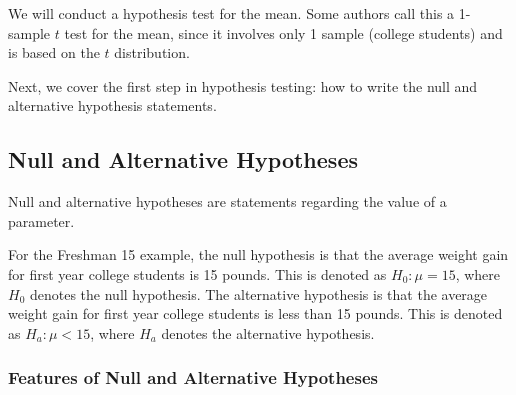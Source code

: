 \documentclass[
]{book}
\theoremstyle{definition}
\theoremstyle{definition}
\theoremstyle{definition}
\theoremstyle{definition}
\theoremstyle{remark}
\begin{document}
We will conduct a hypothesis test for the mean. Some authors call this a 1-sample \(t\) test for the mean, since it involves only 1 sample (college students) and is based on the \(t\) distribution.

Next, we cover the first step in hypothesis testing: how to write the null and alternative hypothesis statements.

\hypertarget{null-and-alternative-hypotheses}{%
\subsection{Null and Alternative Hypotheses}\label{null-and-alternative-hypotheses}}

Null and alternative hypotheses are statements regarding the value of a parameter.

For the Freshman 15 example, the null hypothesis is that the average weight gain for first year college students is 15 pounds. This is denoted as \(H_0: \mu = 15\), where \(H_0\) denotes the null hypothesis. The alternative hypothesis is that the average weight gain for first year college students is less than 15 pounds. This is denoted as \(H_a: \mu < 15\), where \(H_a\) denotes the alternative hypothesis.

\hypertarget{features-of-null-and-alternative-hypotheses}{%
\subsubsection{Features of Null and Alternative Hypotheses}\label{features-of-null-and-alternative-hypotheses}}
\end{document}
